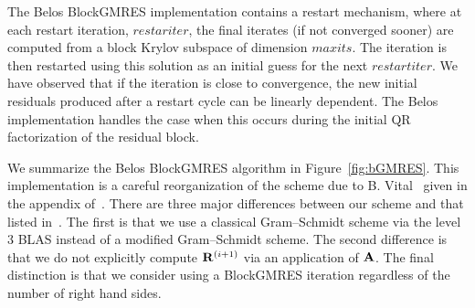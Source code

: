 \documentclass{article}
\newcommand{\bA}{{\bf A}}
\newcommand{\bR}{{\bf R}}
\begin{document}
The Belos BlockGMRES implementation contains a restart mechanism,
where at each restart iteration, $restariter$, the final iterates
(if not converged sooner) are computed from a block Krylov
subspace of dimension $maxits$. The iteration is then restarted
using this solution as an initial guess for the next
$restartiter$. We have observed that if the iteration is close to
convergence, the new initial residuals produced after a restart
cycle can be linearly dependent. The Belos implementation handles
the case when this occurs during the initial QR factorization of
the residual block.

We summarize the Belos BlockGMRES algorithm in
Figure~\ref{fig:bGMRES}. This implementation is a careful
reorganization of the scheme due to B. Vital~\cite{vita:90} given
in the appendix of~\cite{siga:95}. There are three major
differences between our scheme and that listed in~\cite{siga:95}.
The first is that we use a classical Gram--Schmidt scheme via the
level 3 BLAS instead of a modified Gram--Schmidt scheme. The
second difference is that we do not explicitly compute
$\bR^{(i+1)}$ via an application of $\bA$. The final distinction
is that we consider using a BlockGMRES iteration regardless of the
number of right hand sides.

\pagebreak
\end{document}
